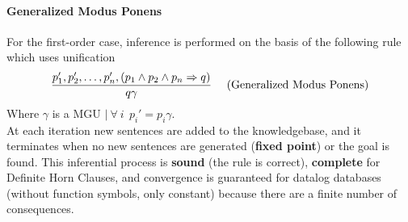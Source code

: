 \documentclass[10pt]{report}
\begin{document}
\paragraph{Generalized Modus Ponens} For the first-order case, inference is performed on the basis of the following rule which uses unification $$\frac{p_1',p_2',\ldots,p_n',(p_1\wedge p_2\wedge p_n\Rightarrow q)}{q\gamma}\:\:\:\:\:\:\hbox{(Generalized Modus Ponens)}$$
Where $\gamma$ is a MGU $|\:\forall\:i\:\:p_i' = p_i\gamma$.\\
At each iteration new sentences are added to the knowledgebase, and it terminates when no new sentences are generated (\textbf{fixed point}) or the goal is found. This inferential process is \textbf{sound} (the rule is correct), \textbf{complete} for Definite Horn Clauses, and convergence is guaranteed for datalog databases (without function symbols, only constant) because there are a finite number of consequences.
\end{document}
